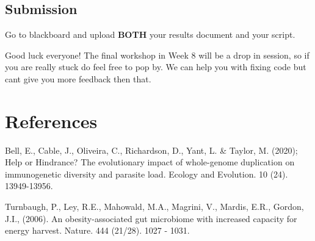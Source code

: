 \documentclass[
]{book}
\begin{document}
\subsection{Submission}\label{submission}

Go to blackboard and upload \textbf{BOTH} your results document and your script.

Good luck everyone! The final workshop in Week 8 will be a drop in session, so if you are really stuck do feel free to pop by. We can help you with fixing code but cant give you more feedback then that.

\section{References}\label{references-11}

Bell, E., Cable, J., Oliveira, C., Richardson, D., Yant, L. \& Taylor, M. (2020); Help or Hindrance? The evolutionary impact of whole-genome duplication on immunogenetic diversity and parasite load. Ecology and Evolution. 10 (24). 13949-13956.

Turnbaugh, P., Ley, R.E., Mahowald, M.A., Magrini, V., Mardis, E.R., Gordon, J.I., (2006). An obesity-associated gut microbiome with increased capacity for energy harvest. Nature. 444 (21/28). 1027 - 1031.
\end{document}
